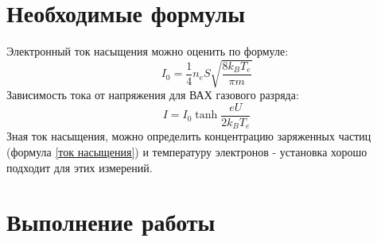 \documentclass[a4paper, 12pt]{article}
\begin{document}
\section*{Необходимые формулы}
Электронный ток насыщения можно оценить по формуле:
\begin{equation}
    I_{0} = \frac{1}{4}n_{e}S\sqrt{\frac{8k_{B}T_{e}}{\pi m}}
    \label{ток насыщения}
\end{equation}
Зависимость тока от напряжения для ВАХ газового разряда:
\begin{equation}
    I = I_{0}\tanh\frac{eU}{2k_{B}T_{e}}
    \label{вах газового разряда}
\end{equation}
Зная ток насыщения, можно определить концентрацию заряженных частиц (формула \ref{ток насыщения}) и температуру электронов - установка хорошо подходит
для этих измерений.
\section*{Выполнение работы}
\end{document}
